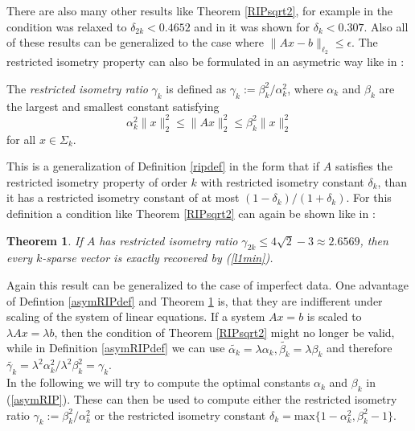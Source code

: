 \documentclass{elsarticle}
\newtheorem{thm}{Theorem}
\begin{document}
There are also many other results like Theorem \ref{RIPsqrt2}, for example in \cite{fou10} the condition was relaxed to $\delta_{2k} < 0.4652$ and in \cite{CWX10} it was shown for $\delta_k < 0.307$. Also all of these results can be
generalized to the case where $\|Ax - b\|_{\ell_2} \leq \epsilon$. The restricted isometry property can also be formulated in an asymetric way like in \cite{FL09}:

\begin{rmk} \label{asymRIPdef}
The \emph{restricted isometry ratio} $\gamma_k$ is defined as $\gamma_k := \beta_k^2 / \alpha_k^2$, where $\alpha_k$ and $\beta_k$ are the largest and smallest constant satisfying
\begin{equation}\label{asymRIP}
   \alpha_k^2\|x\|_2^2 \leq \|Ax\|_2^2 \leq \beta_k^2\|x\|_2^2
\end{equation}
for all $x \in \Sigma_k$.
\end{rmk}

This is a generalization of Definition \ref{ripdef} in the form that if $A$ satisfies the restricted isometry property of order $k$ with restricted isometry constant $\delta_k$, than it has a restricted isometry constant of at most 
$(1 - \delta_k) / (1 + \delta_k)$. For this definition a condition like Theorem \ref{RIPsqrt2} can again be shown like in \cite{FL09}:

\begin{thm} \label{asymRIPtheorem}
If $A$ has restricted isometry ratio $\gamma_{2k} \leq 4 \sqrt{2} - 3 \approx 2.6569$, then every $k$-sparse vector is exactly recovered by (\ref{l1min}). 
\end{thm}

Again this result can be generalized to the case of imperfect data. One advantage of Defintion \ref{asymRIPdef} and Theorem \ref{asymRIPtheorem} is, that they are indifferent under scaling of the system of linear equations. If a system
$Ax=b$ is scaled to $\lambda Ax = \lambda b$, then the condition of Theorem \ref{RIPsqrt2} might no longer be valid, while in Definition \ref{asymRIPdef} we can use $\tilde{\alpha_k} = \lambda \alpha_k, \tilde{\beta_k} = \lambda \beta_k$
and therefore $\tilde{\gamma_k} = \lambda^2 \alpha_k^2 / \lambda^2 \beta_k^2 = \gamma_k$. \\
In the following we will try to compute the optimal constants $\alpha_k$ and $\beta_k$ in (\ref{asymRIP}). These can then be used to compute either the restricted isometry ratio $\gamma_k := \beta_k^2 / \alpha_k^2$ or the restricted
isometry constant $\delta_k = \text{max} \{ 1 - \alpha_k^2, \beta_k^2 - 1 \}$.
\end{document}
